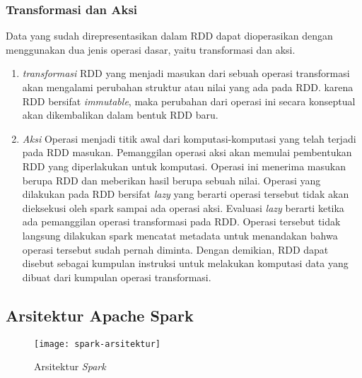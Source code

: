 \subsubsection{Transformasi dan Aksi}
Data yang sudah direpresentasikan dalam RDD dapat dioperasikan dengan menggunakan dua jenis operasi dasar, yaitu transformasi dan aksi.
\begin{enumerate}
	\item{\textit{transformasi}\newline
	RDD yang menjadi masukan dari sebuah operasi transformasi akan mengalami perubahan struktur 	
	atau nilai yang ada pada RDD. karena RDD bersifat \textit{immutable}, maka perubahan dari 		
	operasi ini secara konseptual akan dikembalikan dalam bentuk RDD baru.
	}
	
	\item{\textit{Aksi}\newline
	Operasi menjadi titik awal dari komputasi-komputasi yang telah terjadi pada RDD masukan. 		
	Pemanggilan operasi aksi akan memulai pembentukan RDD yang diperlakukan untuk komputasi. 		
	Operasi ini menerima masukan berupa RDD dan meberikan hasil berupa sebuah nilai.
	}
Operasi yang dilakukan pada RDD bersifat \textit{lazy} yang berarti operasi tersebut tidak akan dieksekusi oleh spark sampai ada operasi aksi. Evaluasi \textit{lazy} berarti ketika ada pemanggilan operasi transformasi pada RDD. Operasi tersebut tidak langsung dilakukan spark mencatat metadata untuk menandakan bahwa operasi tersebut sudah pernah diminta. Dengan demikian, RDD dapat disebut sebagai kumpulan instruksi untuk melakukan komputasi data yang dibuat dari kumpulan operasi transformasi.

\end{enumerate}
\subsection{Arsitektur Apache Spark}

	\begin{figure}[H] 
	\centering  
	\texttt{[image: spark-arsitektur]}  
	\caption[Gambar Arsitektur {\it Spark}]{Arsitektur {\it Spark}} 
	\label{fig:processing-events relationship} 
	\end{figure}
	
